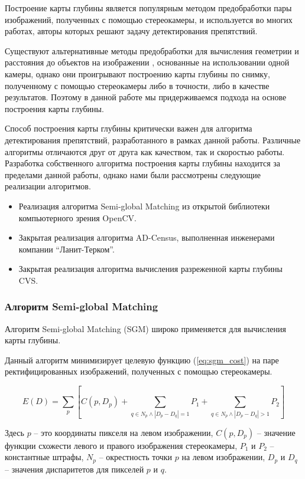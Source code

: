 \documentclass[aps,%
14pt,%
final,%
oneside,
onecolumn,%
musixtex, %
superscriptaddress,%
centertags]{extarticle} %
\begin{document}
Построение карты глубины является популярным методом предобработки пары изображений, полученных с помощью стереокамеры, и используется во многих работах, авторы которых решают задачу детектирования препятствий.

Существуют альтернативные методы предобработки для вычисления геометрии и расстояния до объектов на изображении \cite{monodepth17, koenderink1991affine}, основанные на использовании одной камеры, однако они проигрывают построению карты глубины по снимку, полученному с помощью стереокамеры либо в точности, либо в качестве результатов. Поэтому в данной работе мы придерживаемся подхода на основе построения карты глубины.

Способ построения карты глубины критически важен для алгоритма детектирования препятствий, разработанного в рамках данной работы. Различные алгоритмы отличаются друг от друга как качеством, так и скоростью работы. Разработка собственного алгоритма построения карты глубины находится за пределами данной работы, однако нами были рассмотрены следующие реализации алгоритмов.
\begin{itemize}
\item Реализация алгоритма Semi-global Matching из открытой библиотеки компьютерного зрения OpenCV\cite{itseez2015opencv}.
\item Закрытая реализация алгоритма AD-Census, выполненная инженерами компании ``Ланит-Терком''.
\item Закрытая реализация алгоритма вычисления разреженной карты глубины CVS.
\end{itemize}

\subsubsection{Алгоритм Semi-global Matching}
Алгоритм Semi-global Matching \cite{hirschmuller2005accurate} (SGM) широко применяется для вычисления карты глубины.

Данный алгоритм минимизирует целевую функцию (\ref{eq:sgm_cost}) на паре ректифицированных изображений, полученных с помощью стереокамеры.

\begin{equation} \label{eq:sgm_cost}
E(D)=\sum_p [C(p, D_p) + \sum_{q \in N_p \land |D_p - D_q| = 1} P_1 + \sum_{q \in N_p \land |D_p - D_q| > 1} P_2]
\end{equation}

Здесь $p$ -- это координаты пикселя на левом изображении, $C(p, D_p)$ -- значение функции схожести левого и правого изображения стереокамеры, $P_1$ и $P_2$ -- константные штрафы, $N_p$ -- окрестность точки $p$ на левом изображении, $D_p$ и $D_q$ -- значения диспаритетов для пикселей $p$ и $q$.
\end{document}
